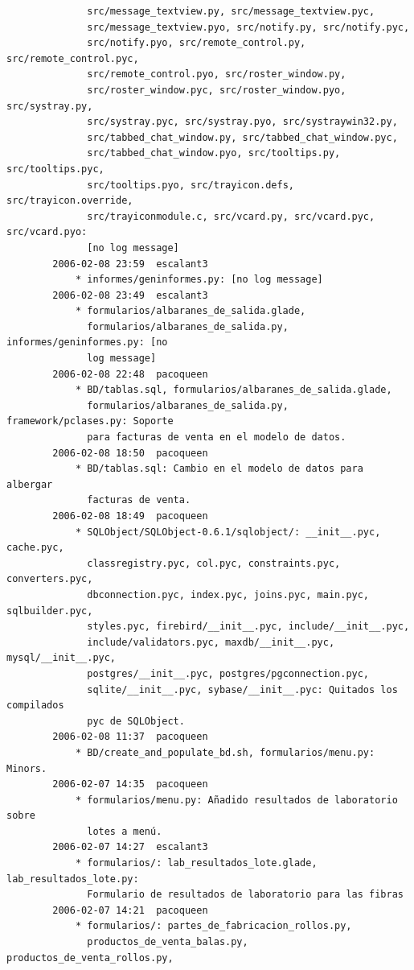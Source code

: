 \documentclass[a4paper]{article}
\begin{document}
\begin{verbatim}
              src/message_textview.py, src/message_textview.pyc,
              src/message_textview.pyo, src/notify.py, src/notify.pyc,
              src/notify.pyo, src/remote_control.py, src/remote_control.pyc,
              src/remote_control.pyo, src/roster_window.py,
              src/roster_window.pyc, src/roster_window.pyo, src/systray.py,
              src/systray.pyc, src/systray.pyo, src/systraywin32.py,
              src/tabbed_chat_window.py, src/tabbed_chat_window.pyc,
              src/tabbed_chat_window.pyo, src/tooltips.py, src/tooltips.pyc,
              src/tooltips.pyo, src/trayicon.defs, src/trayicon.override,
              src/trayiconmodule.c, src/vcard.py, src/vcard.pyc, src/vcard.pyo:
              [no log message]
        2006-02-08 23:59  escalant3
            * informes/geninformes.py: [no log message]
        2006-02-08 23:49  escalant3
            * formularios/albaranes_de_salida.glade,
              formularios/albaranes_de_salida.py, informes/geninformes.py: [no
              log message]
        2006-02-08 22:48  pacoqueen
            * BD/tablas.sql, formularios/albaranes_de_salida.glade,
              formularios/albaranes_de_salida.py, framework/pclases.py: Soporte
              para facturas de venta en el modelo de datos.
        2006-02-08 18:50  pacoqueen
            * BD/tablas.sql: Cambio en el modelo de datos para albergar
              facturas de venta.
        2006-02-08 18:49  pacoqueen
            * SQLObject/SQLObject-0.6.1/sqlobject/: __init__.pyc, cache.pyc,
              classregistry.pyc, col.pyc, constraints.pyc, converters.pyc,
              dbconnection.pyc, index.pyc, joins.pyc, main.pyc, sqlbuilder.pyc,
              styles.pyc, firebird/__init__.pyc, include/__init__.pyc,
              include/validators.pyc, maxdb/__init__.pyc, mysql/__init__.pyc,
              postgres/__init__.pyc, postgres/pgconnection.pyc,
              sqlite/__init__.pyc, sybase/__init__.pyc: Quitados los compilados
              pyc de SQLObject.
        2006-02-08 11:37  pacoqueen
            * BD/create_and_populate_bd.sh, formularios/menu.py: Minors.
        2006-02-07 14:35  pacoqueen
            * formularios/menu.py: Añadido resultados de laboratorio sobre
              lotes a menú.
        2006-02-07 14:27  escalant3
            * formularios/: lab_resultados_lote.glade, lab_resultados_lote.py:
              Formulario de resultados de laboratorio para las fibras
        2006-02-07 14:21  pacoqueen
            * formularios/: partes_de_fabricacion_rollos.py,
              productos_de_venta_balas.py, productos_de_venta_rollos.py,

\end{verbatim}
\end{document}
